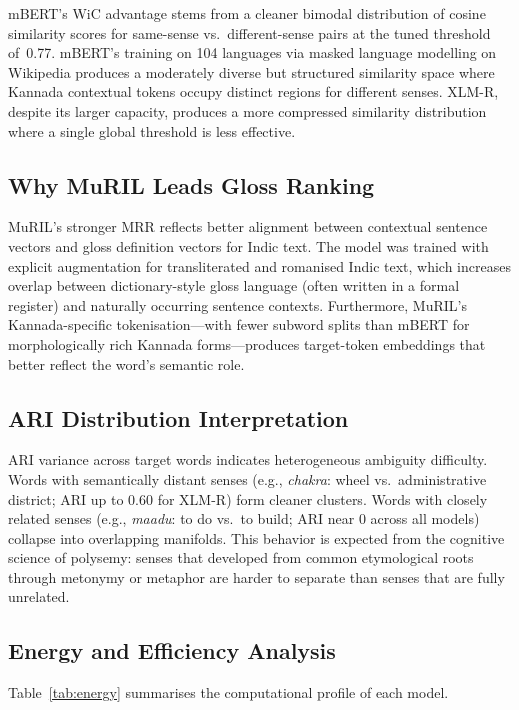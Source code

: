 \documentclass{ieeeaccess}
\begin{document}
mBERT's WiC advantage stems from a cleaner bimodal distribution of cosine
similarity scores for same-sense vs.\ different-sense pairs at the tuned
threshold of~0.77.
mBERT's training on 104 languages via masked language modelling on Wikipedia
produces a moderately diverse but structured similarity space where Kannada
contextual tokens occupy distinct regions for different senses.
XLM-R, despite its larger capacity, produces a more compressed similarity
distribution where a single global threshold is less effective.

\subsection{Why MuRIL Leads Gloss Ranking}

MuRIL's stronger MRR reflects better alignment between contextual sentence
vectors and gloss definition vectors for Indic text.
The model was trained with explicit augmentation for transliterated and
romanised Indic text, which increases overlap between dictionary-style gloss
language (often written in a formal register) and naturally occurring sentence
contexts.
Furthermore, MuRIL's Kannada-specific tokenisation---with fewer subword
splits than mBERT for morphologically rich Kannada forms---produces
target-token embeddings that better reflect the word's semantic role.

\subsection{ARI Distribution Interpretation}

ARI variance across target words indicates heterogeneous ambiguity difficulty.
Words with semantically distant senses (e.g., \textit{chakra}: wheel vs.\
administrative district; ARI up to 0.60 for XLM-R) form cleaner clusters.
Words with closely related senses (e.g., \textit{maadu}: to do vs.\ to build;
ARI near 0 across all models) collapse into overlapping manifolds.
This behavior is expected from the cognitive science of polysemy: senses that
developed from common etymological roots through metonymy or metaphor are
harder to separate than senses that are fully unrelated.

\subsection{Energy and Efficiency Analysis}

Table~\ref{tab:energy} summarises the computational profile of each model.
\end{document}
